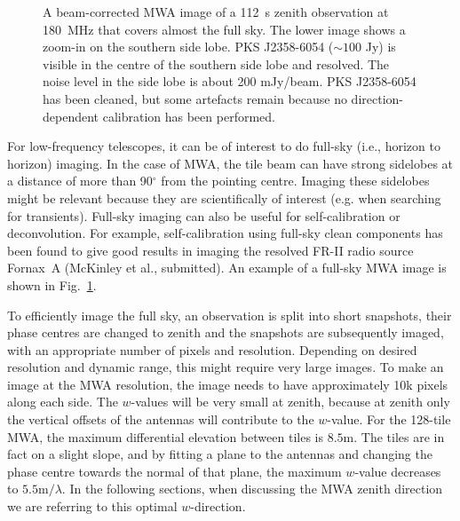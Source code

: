 \documentclass[useAMS,usenatbib]{mn2e}
\newcommand{\degree}{\ensuremath{^{\circ}}\xspace}
\begin{document}
\begin{figure}
\begin{center}
\caption{A beam-corrected MWA image of a 112~s zenith observation at 180~MHz that covers almost the full sky. The lower image shows a zoom-in on the southern side lobe. PKS J2358-6054 ($\sim100$ Jy) is visible in the centre of the southern side lobe and resolved. The noise level in the side lobe is about 200 mJy/beam. PKS J2358-6054 has been cleaned, but some artefacts remain because no direction-dependent calibration has been performed.}
\label{fig:full-sky-example}
\end{center}
\end{figure}

For low-frequency telescopes, it can be of interest to do full-sky (i.e., horizon to horizon) imaging. In the case of MWA, the tile beam can have strong sidelobes at a distance of more than 90\degree from the pointing centre. Imaging these sidelobes might be relevant because they are scientifically of interest (e.g. when searching for transients). Full-sky imaging can also be useful for self-calibration or deconvolution. For example, self-calibration using full-sky clean components has been found to give good results in imaging the resolved FR-II radio source Fornax~A (McKinley et al., submitted). An example of a full-sky MWA image is shown in Fig.~\ref{fig:full-sky-example}.

To efficiently image the full sky, an observation is split into short snapshots, their phase centres are changed to zenith and the snapshots are subsequently imaged, with an appropriate number of pixels and resolution. Depending on desired resolution and dynamic range, this might require very large images. To make an image at the MWA resolution, the image needs to have approximately 10k pixels along each side. The $w$-values will be very small at zenith, because at zenith only the vertical offsets of the antennas will contribute to the $w$-value. For the 128-tile MWA, the maximum differential elevation between tiles is $8.5$m. The tiles are in fact on a slight slope, and by fitting a plane to the antennas and changing the phase centre towards the normal of that plane, the maximum $w$-value decreases to $5.5\textrm{m} / \lambda$. In the following sections, when discussing the MWA zenith direction we are referring to this optimal $w$-direction.
\end{document}
